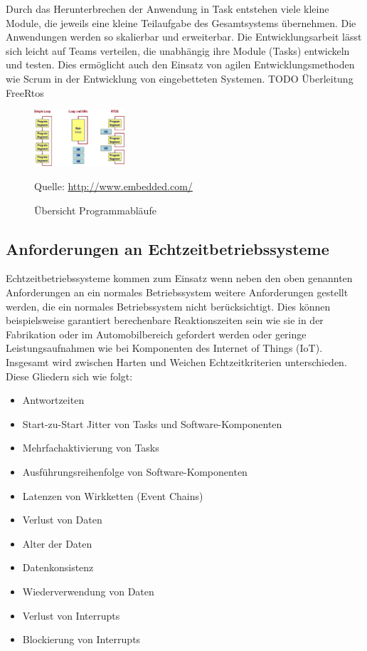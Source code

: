 \documentclass[ngerman]{seminarvorlage}
\newcommand*{\quelle}{%
  \footnotesize Quelle: 
}
\begin{document}
Durch das Herunterbrechen der Anwendung in Task entstehen viele kleine Module, die jeweils eine kleine Teilaufgabe des Gesamtsystems übernehmen. Die Anwendungen werden so skalierbar und erweiterbar. Die Entwicklungsarbeit lässt sich leicht auf Teams verteilen, die unabhängig ihre Module (Tasks) entwickeln und testen. Dies ermöglicht auch den Einsatz von agilen Entwicklungsmethoden wie Scrum in der Entwicklung von eingebetteten Systemen. 
\newline
TODO Überleitung FreeRtos
\newline  
\begin{figure}
	\centering
		\includegraphics[width=0.3\textwidth]{Pictures/EmbeddedCom/cwrtos2f5c.jpg}
	\caption{Übersicht Programmabläufe}
	\quelle\url{http://www.embedded.com/}
	\label{fig:Programmablauf}
\end{figure}



\subsection{Anforderungen an Echtzeitbetriebssysteme}
Echtzeitbetriebssysteme kommen zum Einsatz wenn neben den oben genannten Anforderungen an ein normales Betriebssystem weitere Anforderungen gestellt werden, die ein normales Betriebssystem nicht berücksichtigt. Dies können beispielsweise garantiert berechenbare Reaktionszeiten sein wie sie in der Fabrikation oder im Automobilbereich gefordert werden oder geringe Leistungsaufnahmen wie bei Komponenten des Internet of Things (IoT). Insgesamt wird zwischen Harten und Weichen Echtzeitkriterien unterschieden. Diese Gliedern sich wie folgt:\newline
\begin{itemize}
	\item Antwortzeiten
	\item Start-zu-Start Jitter von Tasks und Software-Komponenten
	\item Mehrfachaktivierung von Tasks
	\item Ausführungsreihenfolge von Software-Komponenten
	\item Latenzen von Wirkketten (Event Chains)
	\item Verlust von Daten
	\item Alter der Daten
	\item Datenkonsistenz
	\item Wiederverwendung von Daten
	\item Verlust von Interrupts
	\item Blockierung von Interrupts
\end{itemize}
\end{document}
